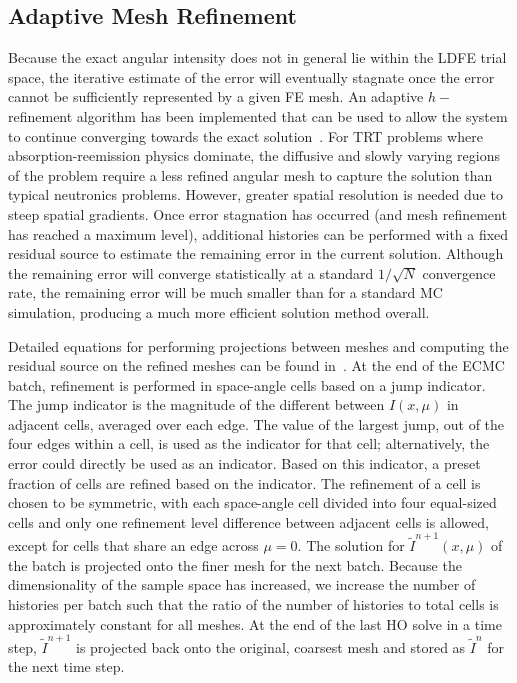 \subsection{Adaptive Mesh Refinement}

Because the exact angular intensity does not in general lie within the LDFE trial space, the
iterative estimate of the error will eventually stagnate once the error cannot be sufficiently
represented by a given FE mesh.  An adaptive $h-$refinement algorithm has been
implemented that can be used to allow the system to continue converging towards the
exact solution~\cite{jake,ans_2014}. For TRT problems where absorption-reemission physics dominate, the diffusive and slowly varying
regions of the problem require a less refined angular mesh to capture the solution than typical neutronics
problems.  However, greater spatial resolution is needed due to steep spatial
gradients.   
Once error stagnation has occurred (and mesh refinement has reached a maximum level),
additional histories can be performed with a
fixed residual source to estimate the remaining error in the current solution.  Although the remaining error will
converge statistically at a standard $1/\sqrt{N}$ convergence rate, the remaining
error will be much smaller than for a standard MC simulation, producing a much more
efficient solution method overall.

Detailed equations for performing projections between meshes and computing the
residual source on the refined meshes can be found in~\cite{jake}.  At the end
of the ECMC batch, refinement is performed in space-angle cells based on a jump
indicator.  The jump indicator is the magnitude of the different between
$I(x,\mu)$ in adjacent cells, averaged over each edge.  The value of the
largest jump, out of the four edges within a cell, is used as the indicator for
that cell; alternatively, the error could directly be used as an indicator. Based on this indicator, a preset fraction of cells are refined
based on the indicator.  The refinement of a cell is chosen to be symmetric,
with each space-angle cell divided into four equal-sized cells and only one
refinement level difference between adjacent cells is allowed, except for cells
that share an edge across $\mu=0$.  The solution for $\tilde{I}^{n+1}(x,\mu)$
of the batch is projected onto the finer mesh for the next batch. Because the
dimensionality of the sample space has increased, we increase the number of
histories per batch such that the ratio of the number of histories to total
cells is approximately constant for all meshes.  At the end of the last HO
solve in a time step, $\tilde{I}^{n+1}$ is projected back onto the original,
coarsest mesh and stored as $\tilde{I}^{n}$ for the next time step.

